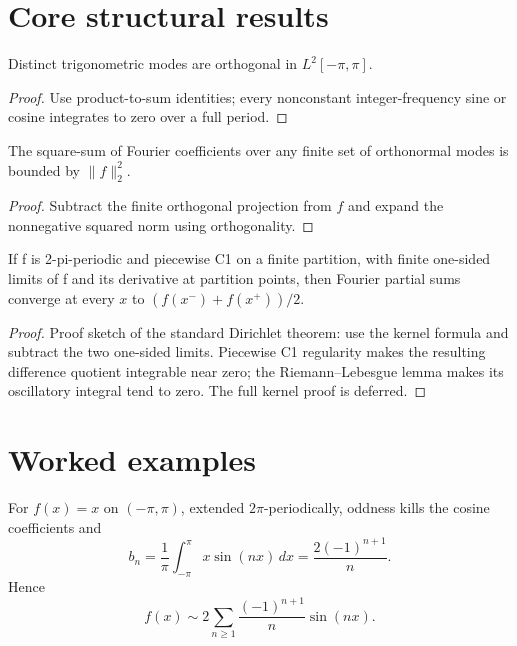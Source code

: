 \section{Core structural results}

\begin{theorem}\label{thm:iii09-01}
Distinct trigonometric modes are orthogonal in $L^2[-\pi,\pi]$.
\begin{proof}
Use product-to-sum identities; every nonconstant integer-frequency sine or cosine integrates to zero over a full period.
\end{proof}
\end{theorem}

\begin{theorem}\label{thm:iii09-02}
The square-sum of Fourier coefficients over any finite set of orthonormal modes is bounded by $\|f\|_2^2$.
\begin{proof}
Subtract the finite orthogonal projection from $f$ and expand the nonnegative squared norm using orthogonality.
\end{proof}
\end{theorem}

\begin{theorem}\label{thm:iii09-03}
If f is 2-pi-periodic and piecewise C1 on a finite partition, with finite one-sided limits of f and its derivative at partition points, then Fourier partial sums converge at every $x$ to $(f(x^-)+f(x^+))/2$.
\begin{proof}
Proof sketch of the standard Dirichlet theorem: use the kernel formula and subtract the two one-sided limits. Piecewise C1 regularity makes the resulting difference quotient integrable near zero; the Riemann--Lebesgue lemma makes its oscillatory integral tend to zero. The full kernel proof is deferred.
\end{proof}
\end{theorem}

\section{Worked examples}

\begin{example}\label{ex:iii09-worked-01}
For \(f(x)=x\) on \((-\pi,\pi)\), extended \(2\pi\)-periodically, oddness
kills the cosine coefficients and
\[
b_n=\frac1\pi\int_{-\pi}^{\pi}x\sin(nx)\,dx
=\frac{2(-1)^{n+1}}{n}.
\]
Hence
\[
f(x)\sim2\sum_{n\ge1}\frac{(-1)^{n+1}}n\sin(nx).
\]
\end{example}

